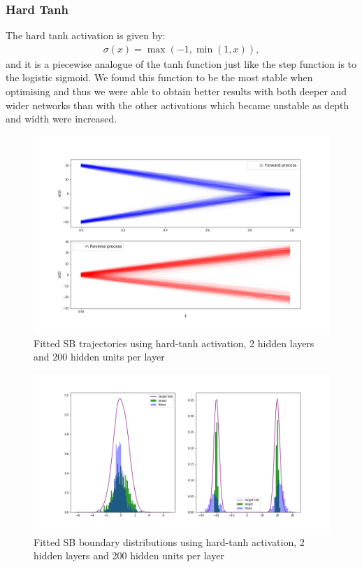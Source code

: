 \documentclass[a4paper,12pt,twoside,openright]{report}
\theoremstyle{definition}
\begin{document}
\subsubsection{Hard Tanh}

The hard tanh activation is given by:
\begin{align*}
    \sigma(x) = \max(-1, \min(1, x)),
\end{align*}
and it is a piecewise analogue of the tanh function just like the step function is to the logistic sigmoid. We found this function to be the most stable when optimising and thus we were able to obtain better results with both deeper and wider networks than with the other activations which became unstable as depth and width were increased.
\begin{figure}
    \centering
    \includegraphics[scale=0.4,trim={4cm 1cm 2.5cm 0}, clip]{images/Control/hard_tanh_200_200__succesfl_bimodal_trajectories.png}
    \caption{ Fitted SB  trajectories using hard-tanh activation, 2 hidden layers and 200 hidden units per layer}
    \label{fig:trajectoriesbimodtanhnnhard}
\end{figure}
\begin{figure}
    \centering
    \includegraphics[scale=0.4,trim={4.3cm 1cm 2.5cm 0}, clip]{images/Control/hard_tanh_200_200_succesfl_bimodal_boundaires.png}
    \caption{ Fitted SB  boundary distributions using hard-tanh activation, 2 hidden layers and 200 hidden units per layer}
    \label{fig:boundsbimodtanhnnhard}
\end{figure}
\end{document}
